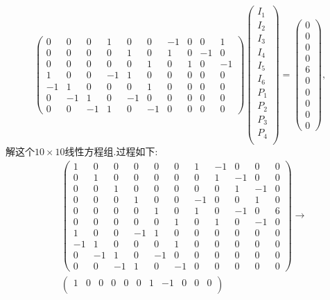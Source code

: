 ﻿\documentclass{book} \usepackage{exsheets} \usepackage{xeCJK}
\begin{document}
\begin{solution}
$$\begin{pmatrix}
  0&0&0&1&0&0&-1&0&0&1\\
  0&0&0&0&1&0&1&0&-1&0\\
  0&0&0&0&0&1&0&1&0&-1\\
  1&0&0&-1&1&0&0&0&0&0\\
  -1&1&0&0&0&1&0&0&0&0\\
  0&-1&1&0&-1&0&0&0&0&0\\
  0&0&-1&1&0&-1&0&0&0&0
\end{pmatrix}
\begin{pmatrix}
  I_1\\
  I_2\\
  I_3\\
  I_4\\
  I_5\\
  I_6\\
  P_{1}\\
  P_2\\
  P_3\\
  P_4\\
\end{pmatrix}=
\begin{pmatrix}
  0\\
  0\\
  0\\
  0\\
  6\\
  0\\
  0\\
  0\\
  0\\
  0
\end{pmatrix},
$$
解这个$10\times 10$线性方程组.过程如下:
\begin{align*}
  &  \begin{pmatrix}
    1&0&0&0&0&0&1&-1&0&0&0\\
    0&1&0&0&0&0&0&1&-1&0&0\\
    0&0&1&0&0&0&0&0&1&-1&0\\
    0&0&0&1&0&0&-1&0&0&1&0\\
    0&0&0&0&1&0&1&0&-1&0&6\\
    0&0&0&0&0&1&0&1&0&-1&0\\
    1&0&0&-1&1&0&0&0&0&0&0\\
    -1&1&0&0&0&1&0&0&0&0&0\\
    0&-1&1&0&-1&0&0&0&0&0&0\\
    0&0&-1&1&0&-1&0&0&0&0&0
  \end{pmatrix}\to\\&
                      \begin{pmatrix}
                        1&0&0&0&0&0&1&-1&0&0&0\\

\end{pmatrix}
\end{align*}
\end{solution}
\end{document}

